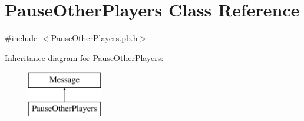 \hypertarget{class_pause_other_players}{\section{Pause\-Other\-Players Class Reference}
\label{class_pause_other_players}
}


{\ttfamily \#include $<$Pause\-Other\-Players.\-pb.\-h$>$}

Inheritance diagram for Pause\-Other\-Players\-:\begin{figure}[H]
\begin{center}
\leavevmode
\includegraphics[height=2.000000cm]{class_pause_other_players}
\end{center}
\end{figure}
